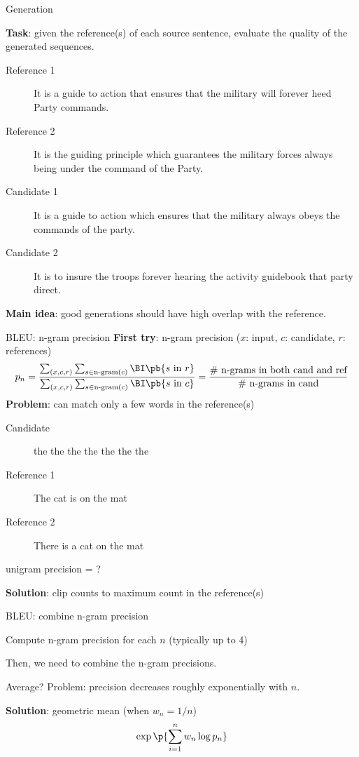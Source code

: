 \documentclass[usenames,dvipsnames,notes,11pt,aspectratio=169,hyperref={colorlinks=true, linkcolor=blue}]{beamer}
\begin{document}
\begin{frame}
    {Generation}

    \textbf{Task}: given the reference(s) of each source sentence, evaluate the quality of the generated sequences.
    \begin{description}
        \item[Reference 1] It is a guide to action that ensures that the military will forever heed Party commands.
        \item[Reference 2] It is the guiding principle which guarantees the military forces always being under the command of the Party. 
        \item[Candidate 1] It is a guide to action which ensures that the military always obeys the commands of the party.
        \item[Candidate 2] It is to insure the troops forever hearing the activity guidebook that party direct.
    \end{description}

    \pause
    \textbf{Main idea}: good generations should have high overlap with the reference.
\end{frame}

\begin{frame}
    {BLEU: n-gram precision}
    \textbf{First try}: n-gram precision ($x$: input, $c$: candidate, $r$: references)
    $$
    p_n = \frac{
        \sum_{(x,c,r)} \sum_{s\in\text{n-gram}(c)} \BI\pb{s \text{ in } r}
    }
    {
\sum_{(x,c,r)} \sum_{s\in\text{n-gram}(c)} \BI\pb{s \text{ in } c}
    } = \frac{
        \text{\# n-grams in both cand and ref}
    }{
        \text{\# n-grams in cand}
    }
    $$
    \pause
    \textbf{Problem}: can match only a few words in the reference(s)\\
    \begin{description}
        \item[Candidate] the the the the the the the
        \item[Reference 1] The cat is on the mat
        \item[Reference 2] There is a cat on the mat
    \end{description}
    unigram precision = ?

    \pause
    \textbf{Solution}: clip counts to maximum count in the reference(s)
\end{frame}

\begin{frame}
    {BLEU: combine n-gram precision}

    Compute n-gram precision for each $n$ (typically up to 4)

    Then, we need to combine the n-gram precisions.

    Average? Problem: precision decreases roughly exponentially with $n$.

    \pause
    \textbf{Solution}: geometric mean (when $w_n=1/n$)
    $$
    \exp\p{\sum_{i=1}^n w_n \log p_n}
    $$
\end{frame}
\end{document}
